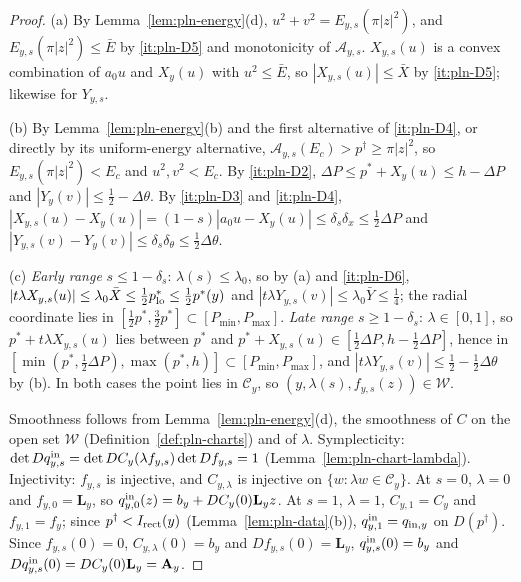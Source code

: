 \begin{proof}
(a) By Lemma~\ref{lem:pln-energy}(d), $u^2+v^2=E_{y,s}(\pi|z|^2)$, and $E_{y,s}(\pi|z|^2)\le\bar E$ by \ref{it:pln-D5}
and monotonicity of $\mathcal A_{y,s}$. $X_{y,s}(u)$ is a convex combination of $a_0u$ and $X_y(u)$ with $u^2\le\bar E$, so
$|X_{y,s}(u)|\le\bar X$ by \ref{it:pln-D5}; likewise for $Y_{y,s}$.

(b) By Lemma~\ref{lem:pln-energy}(b) and the first alternative of \ref{it:pln-D4}, or directly by its uniform-energy alternative,
$\mathcal A_{y,s}(E_c)>p^\dagger\ge\pi|z|^2$, so $E_{y,s}(\pi|z|^2)<E_c$ and
$u^2,v^2<E_c$. By \ref{it:pln-D2}, $\Delta P\le p^*+X_y(u)\le h-\Delta P$ and $|Y_y(v)|\le\frac12-\Delta\theta$. By
\ref{it:pln-D3} and \ref{it:pln-D4}, $|X_{y,s}(u)-X_y(u)|=(1-s)|a_0u-X_y(u)|\le\delta_s\delta_x\le\frac12\Delta P$ and
$|Y_{y,s}(v)-Y_y(v)|\le\delta_s\delta_\theta\le\frac12\Delta\theta$.

(c) \emph{Early range} $s\le1-\delta_s$: $\lambda(s)\le\lambda_0$, so by (a) and \ref{it:pln-D6},
$|t\lambda X_{y,s}(u)|\le\lambda_0\bar X\le\frac12p^*_{\rm lo}\le\frac12p^*(y)$ and $|t\lambda Y_{y,s}(v)|\le\lambda_0\bar Y\le\frac14$; the radial
coordinate lies in $[\frac12p^*,\frac32p^*]\subset[P_{\min},P_{\max}]$. \emph{Late range} $s\ge1-\delta_s$: $\lambda\in[0,1]$, so
$p^*+t\lambda X_{y,s}(u)$ lies between $p^*$ and $p^*+X_{y,s}(u)\in[\frac12\Delta P,h-\frac12\Delta P]$, hence in
$[\min(p^*,\frac12\Delta P),\max(p^*,h)]\subset[P_{\min},P_{\max}]$, and $|t\lambda Y_{y,s}(v)|\le\frac12-\frac12\Delta\theta$ by (b).
In both cases the point lies in $\mathcal C_y$, so $(y,\lambda(s),f_{y,s}(z))\in\mathcal W$.

Smoothness follows from Lemma~\ref{lem:pln-energy}(d), the smoothness of $C$ on the open set $\mathcal W$
(Definition~\ref{def:pln-charts}) and of $\lambda$. Symplecticity: $\det Dq^{\rm in}_{y,s}=\det DC_y(\lambda f_{y,s})\det Df_{y,s}=1$
(Lemma~\ref{lem:pln-chart-lambda}). Injectivity: $f_{y,s}$ is injective, and $C_{y,\lambda}$ is injective on
$\{w:\lambda w\in\mathcal C_y\}$. At $s=0$, $\lambda=0$ and $f_{y,0}=\mathbf L_y$, so $q^{\rm in}_{y,0}(z)=b_y+DC_y(0)\mathbf L_yz$. At
$s=1$, $\lambda=1$, $C_{y,1}=C_y$ and $f_{y,1}=f_y$; since $p^\dagger<I_{\rm rect}(y)$ (Lemma~\ref{lem:pln-data}(b)),
$q^{\rm in}_{y,1}=q_{{\rm in},y}$ on $D(p^\dagger)$. Since $f_{y,s}(0)=0$, $C_{y,\lambda}(0)=b_y$ and $Df_{y,s}(0)=\mathbf L_y$,
$q^{\rm in}_{y,s}(0)=b_y$ and $Dq^{\rm in}_{y,s}(0)=DC_y(0)\mathbf L_y=\mathbf A_y$.


\end{proof}
